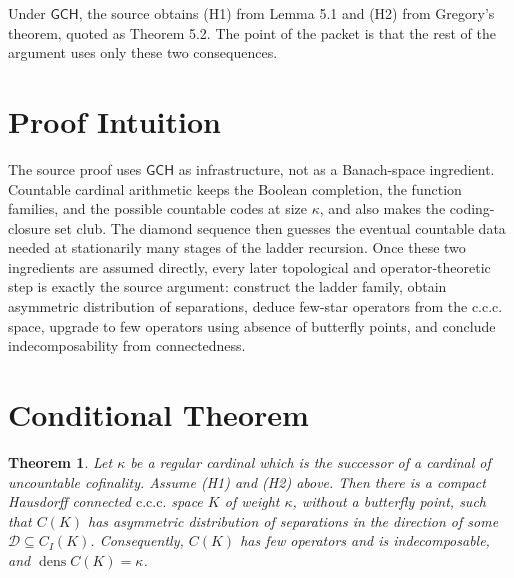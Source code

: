 \documentclass[11pt]{article}
\newtheorem{theorem}{Theorem}
\newcommand{\ccc}{\mathrm{c.c.c.}}
\newcommand{\dens}{\operatorname{dens}}
\newcommand{\D}{\mathcal{D}}
\newcommand{\CI}{C_I}
\newcommand{\GCH}{\mathsf{GCH}}
\begin{document}
Under \(\GCH\), the source obtains (H1) from Lemma 5.1 and (H2) from
Gregory's theorem, quoted as Theorem 5.2.  The point of the packet is that the
rest of the argument uses only these two consequences.

\section*{Proof Intuition}

The source proof uses \(\GCH\) as infrastructure, not as a Banach-space
ingredient.  Countable cardinal arithmetic keeps the Boolean completion, the
function families, and the possible countable codes at size \(\kappa\), and
also makes the coding-closure set club.  The diamond sequence then guesses the
eventual countable data needed at stationarily many stages of the ladder
recursion.  Once these two ingredients are assumed directly, every later
topological and operator-theoretic step is exactly the source argument:
construct the ladder family, obtain asymmetric distribution of separations,
deduce few-star operators from the c.c.c. space, upgrade to few operators
using absence of butterfly points, and conclude indecomposability from
connectedness.

\section*{Conditional Theorem}

\begin{theorem}
Let \(\kappa\) be a regular cardinal which is the successor of a cardinal of
uncountable cofinality.  Assume (H1) and (H2) above.  Then there is a compact
Hausdorff connected \(\ccc\) space \(K\) of weight \(\kappa\), without a
butterfly point, such that \(C(K)\) has asymmetric distribution of separations
in the direction of some \(\D\subseteq \CI(K)\).  Consequently, \(C(K)\) has
few operators and is indecomposable, and \(\dens C(K)=\kappa\).
\end{theorem}
\end{document}
